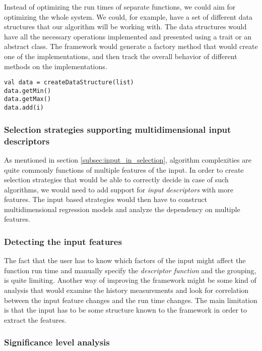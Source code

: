 Instead of optimizing the run times of separate functions, we could aim for optimizing the whole system. We could, for example, have a set of different data structures that our algorithm will be working with. The data structures would have all the necessary operations implemented and presented using a trait or an abstract class. The framework would generate a factory method that would create one of the implementations, and then track the overall behavior of different methods on the implementations. 

\lstset{style=Scala}
\begin{lstlisting}
val data = createDataStructure(list)
data.getMin()
data.getMax()
data.add(i)
\end{lstlisting}

\subsubsection{Selection strategies supporting multidimensional input descriptors}

As mentioned in section \ref{subsec:input_in_selection}, algorithm complexities are quite commonly functions of multiple features of the input. In order to create selection strategies that would be able to correctly decide in case of such algorithms, we would need to add support for \textit{input descriptors} with more features. The input based strategies would then have to construct multidimensional regression models and analyze the dependency on multiple features.

\subsubsection{Detecting the input features}

The fact that the user has to know which factors of the input might affect the function run time and manually specify the \textit{descriptor function} and the grouping, is quite limiting. Another way of improving the framework might be some kind of analysis that would examine the history measurements and look for correlation between the input feature changes and the run time changes. The main limitation is that the input has to be some structure known to the framework in order to extract the features.

\subsubsection{Significance level analysis}


